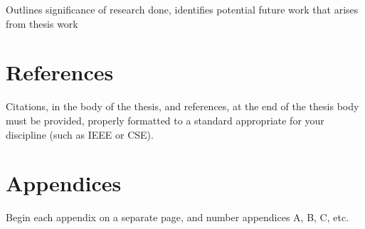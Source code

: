 \documentclass[12pt, a4paper]{article}
\begin{document}
Outlines significance of research done, identifies potential future work that arises from thesis work
\pagebreak

\section*{References}
Citations, in the body of the thesis, and references, at the end of the thesis body must be provided, properly formatted to a standard appropriate for your discipline (such as IEEE or CSE).
\pagebreak

\section*{Appendices}
Begin each appendix on a separate page, and number appendices A, B, C, etc.
\pagebreak
\end{document}
